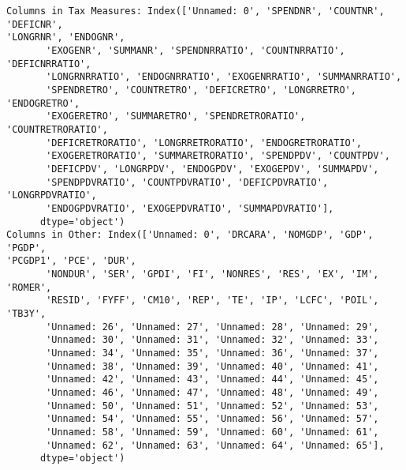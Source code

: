 \documentclass[11pt]{article}
\begin{document}
    \begin{Verbatim}[commandchars=\\\{\}]
Columns in Tax Measures: Index(['Unnamed: 0', 'SPENDNR', 'COUNTNR', 'DEFICNR',
'LONGRNR', 'ENDOGNR',
       'EXOGENR', 'SUMMANR', 'SPENDNRRATIO', 'COUNTNRRATIO', 'DEFICNRRATIO',
       'LONGRNRRATIO', 'ENDOGNRRATIO', 'EXOGENRRATIO', 'SUMMANRRATIO',
       'SPENDRETRO', 'COUNTRETRO', 'DEFICRETRO', 'LONGRRETRO', 'ENDOGRETRO',
       'EXOGERETRO', 'SUMMARETRO', 'SPENDRETRORATIO', 'COUNTRETRORATIO',
       'DEFICRETRORATIO', 'LONGRRETRORATIO', 'ENDOGRETRORATIO',
       'EXOGERETRORATIO', 'SUMMARETRORATIO', 'SPENDPDV', 'COUNTPDV',
       'DEFICPDV', 'LONGRPDV', 'ENDOGPDV', 'EXOGEPDV', 'SUMMAPDV',
       'SPENDPDVRATIO', 'COUNTPDVRATIO', 'DEFICPDVRATIO', 'LONGRPDVRATIO',
       'ENDOGPDVRATIO', 'EXOGEPDVRATIO', 'SUMMAPDVRATIO'],
      dtype='object')
Columns in Other: Index(['Unnamed: 0', 'DRCARA', 'NOMGDP', 'GDP', 'PGDP',
'PCGDP1', 'PCE', 'DUR',
       'NONDUR', 'SER', 'GPDI', 'FI', 'NONRES', 'RES', 'EX', 'IM', 'ROMER',
       'RESID', 'FYFF', 'CM10', 'REP', 'TE', 'IP', 'LCFC', 'POIL', 'TB3Y',
       'Unnamed: 26', 'Unnamed: 27', 'Unnamed: 28', 'Unnamed: 29',
       'Unnamed: 30', 'Unnamed: 31', 'Unnamed: 32', 'Unnamed: 33',
       'Unnamed: 34', 'Unnamed: 35', 'Unnamed: 36', 'Unnamed: 37',
       'Unnamed: 38', 'Unnamed: 39', 'Unnamed: 40', 'Unnamed: 41',
       'Unnamed: 42', 'Unnamed: 43', 'Unnamed: 44', 'Unnamed: 45',
       'Unnamed: 46', 'Unnamed: 47', 'Unnamed: 48', 'Unnamed: 49',
       'Unnamed: 50', 'Unnamed: 51', 'Unnamed: 52', 'Unnamed: 53',
       'Unnamed: 54', 'Unnamed: 55', 'Unnamed: 56', 'Unnamed: 57',
       'Unnamed: 58', 'Unnamed: 59', 'Unnamed: 60', 'Unnamed: 61',
       'Unnamed: 62', 'Unnamed: 63', 'Unnamed: 64', 'Unnamed: 65'],
      dtype='object')
    \end{Verbatim}
\end{document}
